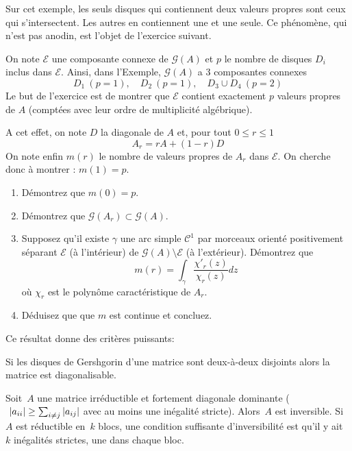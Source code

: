 Sur cet exemple, les seuls disques qui contiennent deux valeurs propres sont
ceux qui s'intersectent. Les autres en contiennent une et une seule. Ce
phénomène, qui n'est pas anodin, est l'objet de l'exercice suivant.

\begin{exercice}
\label{ex:gersh} On note $\mathcal E$ une composante connexe de $\mathcal G(A)$ et $p$ le nombre de disques $D_i$ inclus dans $\mathcal E$. Ainsi, dans l'Exemple, $\mathcal G(A)$ a 3 composantes connexes
\[
D_1 \ (p = 1),\quad D_2 \ (p = 1), \quad D_3 \cup D_4 \ (p= 2)
\]
Le but de l'exercice est de montrer que $\mathcal E$ contient exactement $p$
valeurs propres de $A$ (comptées avec leur ordre de multiplicité algébrique). 

A cet effet, on note $D$ la diagonale de $A$ et, pour tout $0 \leq r \leq 1$
\[
A_r = rA + (1-r)D
\]
On note enfin $m(r)$ le nombre de valeurs propres de $A_r$ dans $\mathcal E$.
On cherche donc à montrer : $m(1) = p$.
\begin{enumerate}
\item Démontrez que $m(0) = p$.
\item Démontrez que $\mathcal G(A_r) \subset \mathcal G(A)$.
\item {Supposez qu'il existe} $\gamma$ une arc simple $\mathcal C^1$ par
	morceaux orienté positivement séparant $\mathcal E$ (à l'intérieur) de
	$\mathcal G(A) \setminus \mathcal E$ (à l'extérieur). Démontrez que
\[
m(r) = \int_{\gamma} \frac{\chi'_{r}(z)}{\chi_{r}(z)}dz
\]
où $\chi_{r}$ est le polynôme caractéristique de $A_r$.
\item Déduisez que que $m$ est continue et concluez.
\end{enumerate}
\end{exercice}

Ce résultat donne des critères puissants:

\begin{corollary}
	Si les disques de Gershgorin d'une matrice sont deux-à-deux disjoints alors
	la matrice est diagonalisable.
\end{corollary}

\begin{proposition}
	Soit~$A$ une matrice irréductible et fortement diagonale dominante
	($\ \left|a_{ii}\right|\ge\sum_{i\neq j}\left|a_{ij}\right|$ avec au moins une inégalité
	stricte).  Alors~$A$ est inversible.  Si~$A$ est réductible en~$k$ blocs,
	une condition suffisante d'inversibilité est qu'il y ait~$k$ inégalités
	strictes, une dans chaque bloc.
\end{proposition}

